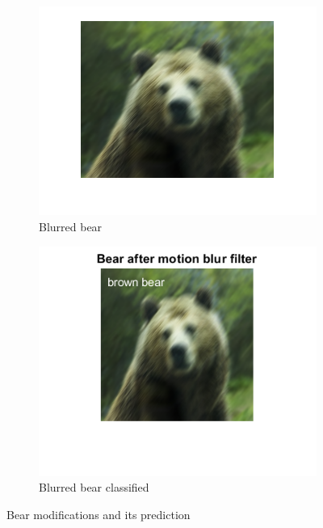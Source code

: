 \documentclass[a4paper]{iacas}
\begin{document}
\begin{figure}
  \begin{subfigure}{0.4\linewidth}
	\includegraphics[width=\linewidth]{imgs/bear_blurred.png}
	\caption{Blurred bear}
  \end{subfigure}
  \begin{subfigure}{0.4\linewidth}
	\includegraphics[width=\linewidth]{imgs/bear_blurred_classified.png}
	\caption{Blurred bear classified}
  \end{subfigure}


\caption{Bear modifications and its prediction}
\label{Bear modified predictions}
\end{figure}
\vskip 0.1in
\end{document}

